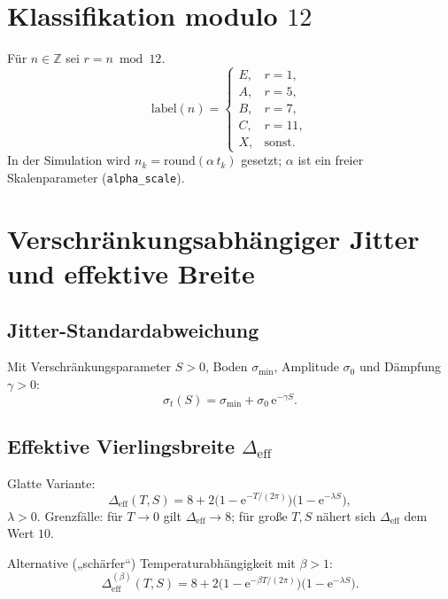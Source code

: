 \documentclass[11pt,a4paper]{article}
\begin{document}
\section{Klassifikation modulo $12$}

Für $n \in \mathbb{Z}$ sei $r = n \bmod 12$.
\begin{equation}
  \mathrm{label}(n) =
  \begin{cases}
    E, & r = 1,\\
    A, & r = 5,\\
    B, & r = 7,\\
    C, & r = 11,\\
    X, & \text{sonst.}
  \end{cases}
\end{equation}
In der Simulation wird $n_k = \mathrm{round}(\alpha\, t_k)$ gesetzt; $\alpha$ ist ein
freier Skalenparameter (\texttt{alpha\_scale}).

\section{Verschränkungsabhängiger Jitter und effektive Breite}

\subsection{Jitter-Standardabweichung}

Mit Verschränkungsparameter $S>0$, Boden $\sigma_{\min}$, Amplitude $\sigma_0$ und
Dämpfung $\gamma>0$:
\begin{equation}
  \sigma_t(S) = \sigma_{\min} + \sigma_0\,\mathrm{e}^{-\gamma S}.
\end{equation}

\subsection{Effektive Vierlingsbreite $\Delta_{\mathrm{eff}}$}

Glatte Variante:
\begin{equation}
  \Delta_{\mathrm{eff}}(T,S)
  = 8 + 2\bigl(1-\mathrm{e}^{-T/(2\pi)}\bigr)\bigl(1-\mathrm{e}^{-\lambda S}\bigr),
\end{equation}
$\lambda>0$. Grenzfälle: für $T\to 0$ gilt $\Delta_{\mathrm{eff}}\to 8$; für große $T,S$
nähert sich $\Delta_{\mathrm{eff}}$ dem Wert $10$.

Alternative („schärfer“) Temperaturabhängigkeit mit $\beta>1$:
\begin{equation}
  \Delta_{\mathrm{eff}}^{(\beta)}(T,S)
  = 8 + 2\bigl(1-\mathrm{e}^{-\beta T/(2\pi)}\bigr)\bigl(1-\mathrm{e}^{-\lambda S}\bigr).
\end{equation}
\end{document}
